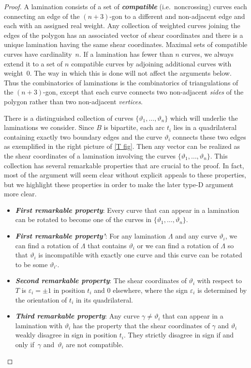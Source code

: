 \documentclass{amsart}
\theoremstyle{definition}
\theoremstyle{remark}
\numberwithin{equation}{section}
\newcommand{\newword}[1]{\textbf{\emph{#1}}}
\newcommand{\thet}{\vartheta}
\newcommand{\set}[1]{{\lbrace #1 \rbrace}}
\newcommand{\0}{{\mathbf{0}}}
\begin{document}
\begin{proof}
A lamination consists of a set of \newword{compatible} (i.e.\ noncrossing) curves each connecting an edge of the $(n+3)$-gon to a different and non-adjacent edge and each with an assigned real weight.
Any collection of weighted curves joining the edges of the polygon has an associated vector of shear coordinates and there is a unique lamination having the same shear coordinates.
Maximal sets of compatible curves have cardinality~$n$.
If a lamination has fewer than $n$ curves, we always extend it to a set of $n$ compatible curves by adjoining additional curves with weight~$0$.
The way in which this is done will not affect the arguments below.
Thus the combinatorics of laminations is the combinatorics of triangulations of the $(n+3)$-gon, except that each curve connects two non-adjacent \emph{sides} of the polygon rather than two non-adjacent \emph{vertices}.

There is a distinguished collection of curves $\set{\thet_1,\ldots,\thet_n}$ which will underlie the laminations we consider.
Since $B$ is bipartite, each arc $t_i$ lies in a quadrilateral containing exactly two boundary edges and the curve $\thet_i$ connects these two edges as exemplified in the right picture of \cref{T fig}.
Then any vector can be realized as the shear coordinates of a lamination involving the curves $\set{\thet_1,\ldots,\thet_n}$.
This collection has several remarkable properties that are crucial to the proof.  
In fact, most of the argument will seem clear without explicit appeals to these properties, but we highlight these properties in order to make the later type-D argument more clear.

\begin{itemize}
\item
\newword{First remarkable property}:
Every curve that can appear in a lamination can be rotated to become one of the curves in $\set{\thet_1,\ldots,\thet_n}$.
\item
\newword{First remarkable property'}:
    For any lamination $\Lambda$ and any curve $\thet_i$, we can find a rotation of $\Lambda$ that contains $\thet_i$ or we can find a  rotation of $\Lambda$ so that $\thet_i$ is incompatible with exactly one curve and this curve can be rotated to be some $\thet_{i'}$.
\item
\newword{Second remarkable property}:
The shear coordinates of $\thet_i$ with respect to $T$ is $\varepsilon_i=\pm1$ in position $t_i$ and $0$ elsewhere, where the sign $\varepsilon_i$ is determined by the orientation of $t_i$ in its quadrilateral.
\item
\newword{Third remarkable property}:
Any curve $\gamma\neq\thet_i$ that can appear in a lamination with $\thet_i$ has the property that the shear coordinates of $\gamma$ and $\thet_i$ weakly disagree in sign in position $t_i$.
They strictly disagree in sign if and only if~$\gamma$ and~$\thet_i$ are not compatible.
\end{itemize}


\end{proof}
\end{document}
